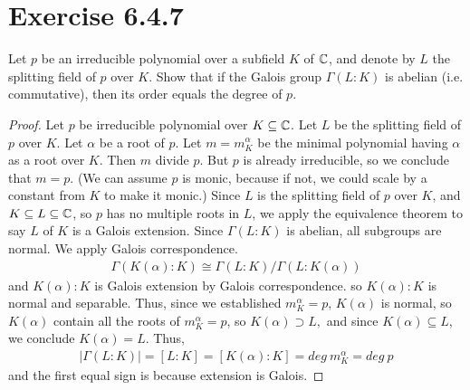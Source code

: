 \documentclass[12pt,english]{article}
\begin{document}
\section*{Exercise 6.4.7}
\begin{question}
    Let $p$ be an irreducible polynomial over a subfield $K$ of $\mathbb{C}$, and denote by $L$ the splitting field of $p$ over $K$. 
    Show that if the Galois group $\Gamma (L:K)$ is abelian (i.e. commutative), 
    then its order equals the degree of $p$.
\end{question}

\begin{proof}
    Let $p$ be irreducible polynomial over $K \subseteq \mathbb{C}$.
    Let $L$ be the splitting field of $p$ over $K$.
    Let $\alpha$ be a root of $p$.
    Let $m = m_K^{\alpha}$ be the minimal polynomial having $\alpha$ as a root over $K$.
    Then $m$ divide $p$. But $p$ is already irreducible, so we conclude that $m = p$. 
    (We can assume $p$ is monic, because if not, we could scale by a constant
    from $K$ to make it monic.)
    Since $L$ is the splitting field of $p$ over $K$, and $K \subseteq L \subseteq \mathbb{C}$, 
    so $p$ has no multiple roots in $L$, we apply the equivalence theorem
    to say $L$ of $K$ is a Galois extension. Since $\Gamma(L:K)$ is abelian,
    all subgroups are normal. We apply Galois correspondence.
    \begin{align}
        \Gamma(K(\alpha):K) \cong \Gamma(L:K)/\Gamma(L:K(\alpha))
    \end{align}
    and $K(\alpha):K$ is Galois extension by Galois correspondence.
    so $K(\alpha):K$ is normal and separable.
    Thus, since we established $m_K^{\alpha} = p$, $K(\alpha)$ is normal,
    so $K(\alpha)$ contain all the roots of $m_K^{\alpha}=p$, 
    so $K(\alpha) \supset L,$ and since $K(\alpha) \subseteq L$,
    we conclude $K(\alpha) = L$. Thus,
    \begin{align}
        \lvert \Gamma(L:K) \rvert = [L:K] = [K(\alpha):K] = deg \ m_K^{\alpha} = deg \ p
    \end{align}
    and the first equal sign is because extension is Galois.
    
\end{proof}
\end{document}
